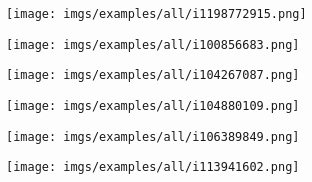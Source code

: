 \documentclass{article}
\begin{document}
\begin{figure}[htbp]
  \centering
  \begin{subfigure}{0.3\textwidth}
    \texttt{[image: imgs/examples/all/i1198772915.png]}
  \end{subfigure}
  \begin{subfigure}{0.3\textwidth}
    \texttt{[image: imgs/examples/all/i100856683.png]}
  \end{subfigure}
  \begin{subfigure}{0.3\textwidth}
    \texttt{[image: imgs/examples/all/i104267087.png]}
  \end{subfigure}
  
  \begin{subfigure}{0.3\textwidth}
    \texttt{[image: imgs/examples/all/i104880109.png]}
  \end{subfigure}
  \begin{subfigure}{0.3\textwidth}
    \texttt{[image: imgs/examples/all/i106389849.png]}
  \end{subfigure}
  \begin{subfigure}{0.3\textwidth}
    \texttt{[image: imgs/examples/all/i113941602.png]}
  \end{subfigure}
  
  
\end{figure}
\end{document}
